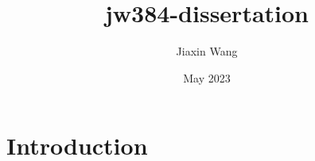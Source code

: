 \documentclass{article}
\title{jw384-dissertation}
\author{Jiaxin Wang}
\date{May 2023}
\begin{document}
\maketitle

\section{Introduction}
\end{document}
